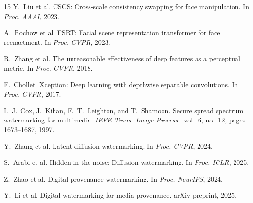 \documentclass{article}
\begin{document}
\begin{thebibliography}{15}
Y.~Liu et al.
\newblock CSCS: Cross-scale consistency swapping for face manipulation.
\newblock In \textit{Proc. AAAI}, 2023.

A.~Rochow et al.
\newblock FSRT: Facial scene representation transformer for face reenactment.
\newblock In \textit{Proc. CVPR}, 2023.

R.~Zhang et al.
\newblock The unreasonable effectiveness of deep features as a perceptual metric.
\newblock In \textit{Proc. CVPR}, 2018.

F.~Chollet.
\newblock Xception: Deep learning with depthwise separable convolutions.
\newblock In \textit{Proc. CVPR}, 2017.

I.~J.~Cox, J.~Kilian, F.~T.~Leighton, and T.~Shamoon.
\newblock Secure spread spectrum watermarking for multimedia.
\newblock \textit{IEEE Trans. Image Process.}, vol.~6, no.~12, pages 1673–1687, 1997.

Y.~Zhang et al.
\newblock Latent diffusion watermarking.
\newblock In \textit{Proc. CVPR}, 2024.

S.~Arabi et al.
\newblock Hidden in the noise: Diffusion watermarking.
\newblock In \textit{Proc. ICLR}, 2025.

Z.~Zhao et al.
\newblock Digital provenance watermarking.
\newblock In \textit{Proc. NeurIPS}, 2024.

Y.~Li et al.
\newblock Digital watermarking for media provenance.
\newblock arXiv preprint, 2025.

\end{thebibliography}
\end{document}

